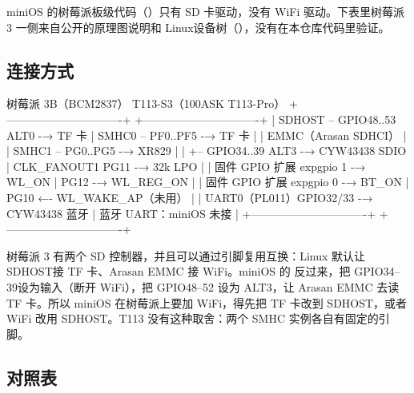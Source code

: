miniOS 的树莓派板级代码（）只有 SD 卡驱动，没有 WiFi 驱动。下表里树莓派 3 一侧来自公开的原理图说明和 Linux设备树（），没有在本仓库代码里验证。

\subsection{连接方式}

\begin{txtcode}
树莓派 3B（BCM2837）                                   T113-S3（100ASK T113-Pro）
+-------------------------------+                     +-------------------------------+
| SDHOST -- GPIO48..53 ALT0 -→ TF 卡                  | SMHC0 -- PF0..PF5 -→ TF 卡     |
| EMMC（Arasan SDHCI）          |                     | SMHC1 -- PG0..PG5 -→ XR829     |
|   +-- GPIO34..39 ALT3 -→ CYW43438 SDIO              | CLK_FANOUT1 PG11 -→ 32k LPO    |
| 固件 GPIO 扩展 expgpio 1 -→ WL_ON                    | PG12 -→ WL_REG_ON              |
| 固件 GPIO 扩展 expgpio 0 -→ BT_ON                    | PG10 ←- WL_WAKE_AP（未用）     |
| UART0（PL011）GPIO32/33 -→ CYW43438 蓝牙            | 蓝牙 UART：miniOS 未接         |
+-------------------------------+                     +-------------------------------+
\end{txtcode}

树莓派 3 有两个 SD 控制器，并且可以通过引脚复用互换：Linux 默认让 SDHOST接 TF 卡、Arasan EMMC 接 WiFi。miniOS 的  反过来，把 GPIO34–39设为输入（断开 WiFi），把 GPIO48–52 设为 ALT3，让 Arasan EMMC 去读 TF 卡。所以 miniOS 在树莓派上要加 WiFi，得先把 TF 卡改到 SDHOST，或者 WiFi 改用 SDHOST。T113 没有这种取舍：两个 SMHC 实例各自有固定的引脚。

\subsection{对照表}

